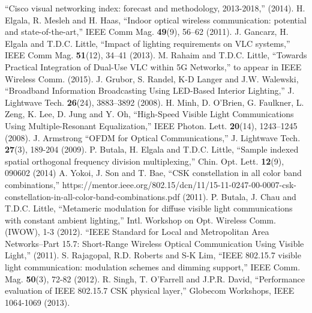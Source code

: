 \documentclass[10pt,letterpaper]{article}
\begin{document}

\begin{thebibliography}{99}
 ``{Cisco visual networking index: forecast and methodology, 2013-2018},'' (2014).
 H. Elgala, R. Mesleh and H. Haas, ``{Indoor optical wireless communication: potential and state-of-the-art},'' IEEE Comm Mag. {\bf 49}(9), 56--62 (2011).
 J. Gancarz, H. Elgala and T.D.C. Little, ``{Impact of lighting requirements on VLC systems},'' IEEE Comm Mag. {\bf 51}(12), 34--41 (2013).
 M. Rahaim and T.D.C. Little, ``{Towards Practical Integration of Dual-Use VLC within 5G Networks},'' to appear in IEEE Wireless Comm. (2015).
 J. Grubor, S. Randel, K-D Langer and J.W. Walewski, ``{Broadband Information Broadcasting Using LED-Based Interior Lighting},'' J. Lightwave Tech. {\bf 26}(24), 3883--3892 (2008).
 H. Minh, D. O'Brien, G. Faulkner, L. Zeng, K. Lee, D. Jung and Y. Oh, ``{High-Speed Visible Light Communications Using Multiple-Resonant Equalization},'' IEEE Photon. Lett. {\bf 20}(14), 1243--1245 (2008).
 J. Armstrong ``{OFDM for Optical Communications},'' J. Lightwave Tech. {\bf 27}(3), 189-204 (2009).
 P. Butala, H. Elgala and T.D.C. Little, ``{Sample indexed spatial orthogonal frequency division multiplexing},'' Chin. Opt. Lett. {\bf 12}(9), 090602 (2014)
 A. Yokoi, J. Son and T. Bae, ``{CSK constellation in all color band combinations},'' {https://mentor.ieee.org/802.15/dcn/11/15-11-0247-00-0007-csk-constellation-in-all-color-band-combinations.pdf} (2011).
 P. Butala, J. Chau and T.D.C. Little, ``{Metameric modulation for diffuse visible light communications with constant ambient lighting},'' Intl. Workshop on Opt. Wireless Comm. (IWOW), 1-3 (2012).
 ``{IEEE Standard for Local and Metropolitan Area Networks--Part 15.7: Short-Range Wireless Optical Communication Using Visible Light},'' (2011).
 S. Rajagopal, R.D. Roberts and S-K Lim, ``{IEEE 802.15.7 visible light communication: modulation schemes and dimming support},'' IEEE Comm. Mag. {\bf 50}(3), 72-82 (2012).
 R. Singh, T. O'Farrell and J.P.R. David, ``{Performance evaluation of IEEE 802.15.7 CSK physical layer},'' Globecom Workshops, IEEE 1064-1069 (2013).


\end{thebibliography}
\end{document}
